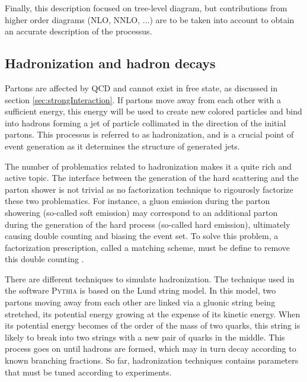             Finally, this description focused on tree-level diagram, but contributions from
            higher order diagrams (NLO, NNLO, ...) are to be taken into account to obtain
            an accurate description of the processus.

            \subsection{Hadronization and hadron decays}

            Partons are affected by QCD and cannot exist in free state, as discussed in
            section \ref{sec:strongInteraction}. If partons move away from each other
            with a sufficient energy, this energy will be used to create new colored
            particles and bind into hadrons forming a jet of particle collimated in the
            direction of the initial partons. This processus is referred to as hadronization,
            and is a crucial point of event generation as it determines the structure
            of generated jets.

            The number of problematics related to hadronization makes it a quite rich and
            active topic. The interface between the generation of the hard scattering
            and the parton shower is not trivial as no factorization technique to rigourosly
            factorize these two problematics. For instance, a gluon emission during
            the parton showering (so-called soft emission) may correspond to an additional
            parton during the generation of the hard process (so-called hard emission),
            ultimately causing double counting and biasing the event set. To solve this
            problem, a factorization prescription, called a matching scheme, must be define
            to remove this double counting .

            There are different techniques to simulate hadronization. The
            technique used in the software \textsc{Pythia} is based on the Lund string
            model. In this model, two partons moving away from each other are linked
            via a gluonic string being stretched, its potential energy growing at
            the expense of its kinetic energy. When its potential energy becomes of the
            order of the mass of two quarks, this string is likely to break into two
            strings with a new pair of quarks in the middle. This process goes on until
            hadrons are formed, which may in turn decay according to known branching
            fractions. So far, hadronization techniques contains parameters that must
            be tuned according to experiments.

